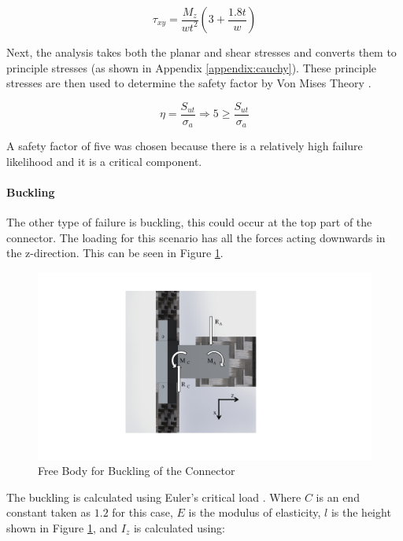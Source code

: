 \documentclass[../main.tex]{subfiles}
\begin{document}
\begin{equation} \label{eqn:armtorsionShear}
\tau_{xy} = \dfrac{M_{z}}{wt^2}(3+\frac{1.8t}{w})
\end{equation}

Next, the analysis takes both the planar and shear stresses and converts them to principle stresses (as shown in Appendix \ref{appendix:cauchy}). These principle stresses are then used to determine the safety factor by Von Mises Theory \cite[221]{shigley}.

\begin{equation}
\eta = \dfrac{S_{ut}}{\sigma _a} \Rightarrow 5 \geq \dfrac{S_{ut}}{\sigma _a}
\end{equation}

A safety factor of five was chosen because there is a relatively high failure likelihood and it is a critical component.\\

\paragraph*{Buckling}
The other type of failure is buckling, this could occur at the top part of the connector. The loading for this scenario has all the forces acting downwards in the z-direction. This can be seen  in Figure \ref{fig:armConnectorBuck}.

\begin{figure}[H]
	\centering
	\includegraphics[page={2}, width=.8\linewidth]{img/analysis/arm/armConnector.pdf}
	\caption{Free Body for Buckling of the Connector}
	\label{fig:armConnectorBuck}
\end{figure}

The buckling is calculated using Euler's critical load \cite[178]{shigley}. Where $C$ is an end constant taken as $1.2$ for this case, $E$ is the modulus of elasticity, $l$ is the height shown in Figure \ref{fig:armConnectorBuck}, and $I_z$ is calculated using: 
\end{document}
